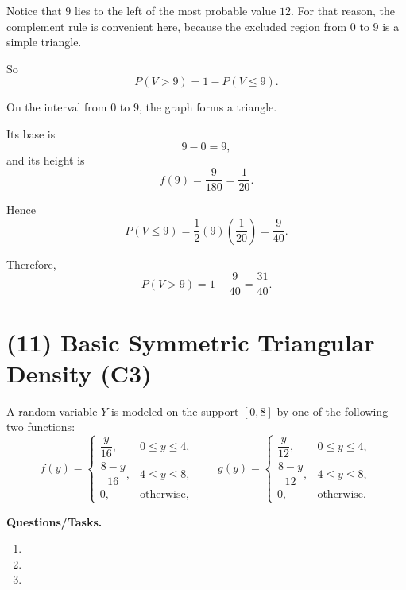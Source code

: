 Notice that $9$ lies to the left of the most probable value $12$. For that reason, the complement rule is convenient here, because the excluded region from $0$ to $9$ is a simple triangle.

So
\[
P(V>9)=1-P(V\le 9).
\]

On the interval from $0$ to $9$, the graph forms a triangle.

Its base is
\[
9-0=9,
\]
and its height is
\[
f(9)=\frac{9}{180}=\frac{1}{20}.
\]

Hence
\[
P(V\le 9)=\frac12(9)\left(\frac{1}{20}\right)=\frac{9}{40}.
\]

Therefore,
\[
P(V>9)=1-\frac{9}{40}=\frac{31}{40}.
\]

	


\section{(11) Basic Symmetric Triangular Density (C3)}
\label{sec:basic-symmetric-triangular-density-c3}

A random variable $Y$ is modeled on the support $[0,8]$ by one of the following two functions:
\[
f(y)=\begin{cases}
	\dfrac{y}{16}, & 0\le y\le 4,\\
	\dfrac{8-y}{16}, & 4\le y\le 8,\\
	0, & \text{otherwise,}
\end{cases}
\qquad
g(y)=\begin{cases}
	\dfrac{y}{12}, & 0\le y\le 4,\\
	\dfrac{8-y}{12}, & 4\le y\le 8,\\
	0, & \text{otherwise.}
\end{cases}
\]

\textbf{Questions/Tasks.}
\begin{enumerate}[label=(\alph*)]
	\item {}
	\item {}
	\item {}
\end{enumerate}


